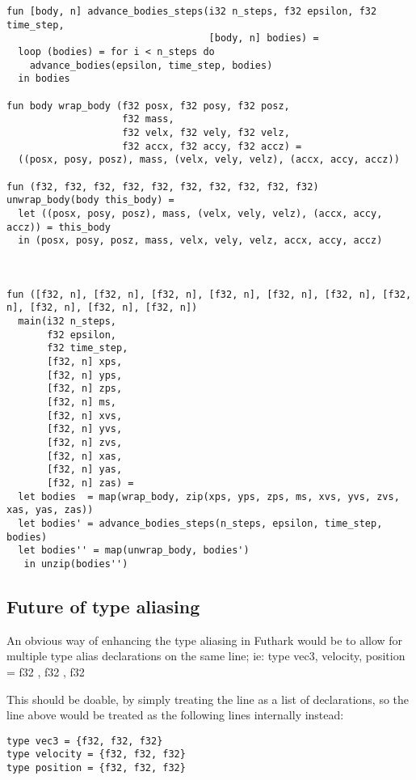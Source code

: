 \begin{lstlisting}
fun [body, n] advance_bodies_steps(i32 n_steps, f32 epsilon, f32 time_step,
                                   [body, n] bodies) =
  loop (bodies) = for i < n_steps do
    advance_bodies(epsilon, time_step, bodies)
  in bodies

fun body wrap_body (f32 posx, f32 posy, f32 posz,
                    f32 mass,
                    f32 velx, f32 vely, f32 velz,
                    f32 accx, f32 accy, f32 accz) =
  ((posx, posy, posz), mass, (velx, vely, velz), (accx, accy, accz))

fun (f32, f32, f32, f32, f32, f32, f32, f32, f32, f32) unwrap_body(body this_body) =
  let ((posx, posy, posz), mass, (velx, vely, velz), (accx, accy, accz)) = this_body
  in (posx, posy, posz, mass, velx, vely, velz, accx, accy, accz)



fun ([f32, n], [f32, n], [f32, n], [f32, n], [f32, n], [f32, n], [f32, n], [f32, n], [f32, n], [f32, n])
  main(i32 n_steps,
       f32 epsilon,
       f32 time_step,
       [f32, n] xps,
       [f32, n] yps,
       [f32, n] zps,
       [f32, n] ms,
       [f32, n] xvs,
       [f32, n] yvs,
       [f32, n] zvs,
       [f32, n] xas,
       [f32, n] yas,
       [f32, n] zas) =
  let bodies  = map(wrap_body, zip(xps, yps, zps, ms, xvs, yvs, zvs, xas, yas, zas))
  let bodies' = advance_bodies_steps(n_steps, epsilon, time_step, bodies)
  let bodies'' = map(unwrap_body, bodies')
   in unzip(bodies'')
\end{lstlisting}

\subsection{Future of type aliasing}
An obvious way of enhancing the type aliasing in Futhark would be to allow for
multiple type alias declarations on the same line; ie:
type vec3, velocity, position = {f32 , f32 , f32}

This should be doable, by simply treating the line as a list of declarations, so
the line above would be treated as the following lines internally instead:
\begin{verbatim}
type vec3 = {f32, f32, f32}
type velocity = {f32, f32, f32}
type position = {f32, f32, f32}
\end{verbatim}